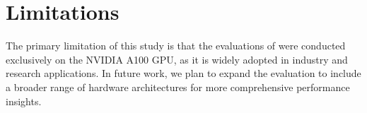 \section*{Limitations}
The primary limitation of this study is that the evaluations of \benchall were conducted exclusively on the NVIDIA A100 GPU, as it is widely adopted in industry and research applications. In future work, we plan to expand the evaluation to include a broader range of hardware architectures for more comprehensive performance insights.